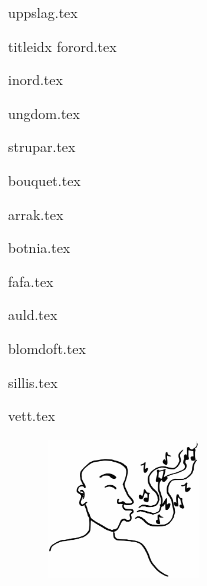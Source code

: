 \documentclass[a6paper,8pt,makeidx,openany]{book}
\begin{document}
{uppslag.tex}

\begin{songs}{titleidx}
{forord.tex}

{inord.tex}
\sclearpage

{ungdom.tex}
\sclearpage

{strupar.tex}	
\sclearpage

{bouquet.tex}	
\sclearpage

{arrak.tex}	
\sclearpage

{botnia.tex}	
\sclearpage

{fafa.tex}	
\sclearpage

{auld.tex}	
\sclearpage

{blomdoft.tex}
\sclearpage

{sillis.tex}
\sclearpage

{vett.tex}
\sclearpage


\end{songs}
\begin{figure}[h]
	\begin{center}
		\includegraphics[width=40mm]{./bilder/fardigabilder/BilderTillKapitel/visslaren.png} 
	\end{center}
\end{figure}
\renewcommand{\idxtitlefont}{\rmfamily\mdseries}
\renewcommand{\idxlyricfont}{\rmfamily\mdseries}
\renewcommand{\idxheadfont}{\sffamily\it\large}
\setlength{\idxheadwidth}{0.5cm}
\end{document}

